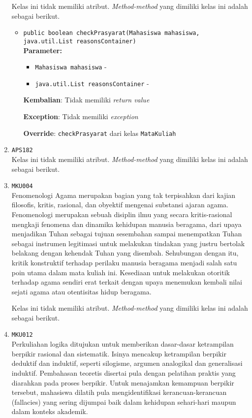 \documentclass{article}
\begin{document}
\begin{enumerate}
Kelas ini tidak memiliki atribut. \textit{Method-method} yang dimiliki kelas ini adalah sebagai berikut.
\begin{itemize}
\item \texttt{public boolean checkPrasyarat(Mahasiswa mahasiswa, java.util.List reasonsContainer)}\\ 


\textbf{Parameter:}\begin{itemize}
\item \texttt{Mahasiswa mahasiswa} - 
\item \texttt{java.util.List reasonsContainer} - 
\end{itemize}
\textbf{Kembalian}: Tidak memiliki \textit{return value}

\textbf{Exception}: Tidak memiliki \textit{exception}

\textbf{Override}: \texttt{checkPrasyarat} dari kelas \texttt{MataKuliah}

\end{itemize}
\item \texttt{APS182}\\ 
Kelas ini tidak memiliki atribut. \textit{Method-method} yang dimiliki kelas ini adalah sebagai berikut.
\begin{itemize}
\end{itemize}
\item \texttt{MKU004}\\ 
Fenomenologi Agama merupakan bagian yang tak terpisahkan dari kajian filosofis, kritis, 
 rasional, dan obyektif mengenai substansi ajaran agama. Fenomenologi merupakan sebuah 
 disiplin ilmu yang secara kritis-rasional mengkaji fenomena dan dinamika kehidupan manusia 
 beragama, dari upaya menjadikan Tuhan sebagai tujuan sesembahan sampai menempatkan Tuhan 
 sebagai instrumen legitimasi untuk melakukan tindakan yang justru bertolak belakang dengan 
 kehendak Tuhan yang disembah. Sehubungan dengan itu, kritik konstruktif terhadap perilaku 
 manusia beragama menjadi salah satu poin utama dalam mata kuliah ini. Kesediaan untuk 
 melakukan otoritik terhadap agama sendiri erat terkait dengan upaya menemukan kembali nilai
 sejati agama atau otentisitas hidup beragama.

Kelas ini tidak memiliki atribut. \textit{Method-method} yang dimiliki kelas ini adalah sebagai berikut.
\begin{itemize}
\end{itemize}
\item \texttt{MKU012}\\ 
Perkuliahan logika ditujukan untuk memberikan dasar-dasar ketrampilan berpikir rasional dan
 sistematik. Isinya mencakup ketrampilan berpikir deduktif dan induktif, seperti silogisme, 
 argumen analogikal dan generalisasi induktif. Pembahasan teoretis disertai pula dengan
 pelatihan praktis yang diarahkan pada proses berpikir. Untuk menajamkan kemampuan berpikir 
 tersebut, mahasiswa dilatih pula mengidentifikasi kerancuan-kerancuan (fallacies) yang sering 
 dijumpai baik dalam kehidupan sehari-hari maupun dalam konteks akademik.


\end{enumerate}
\end{document}
